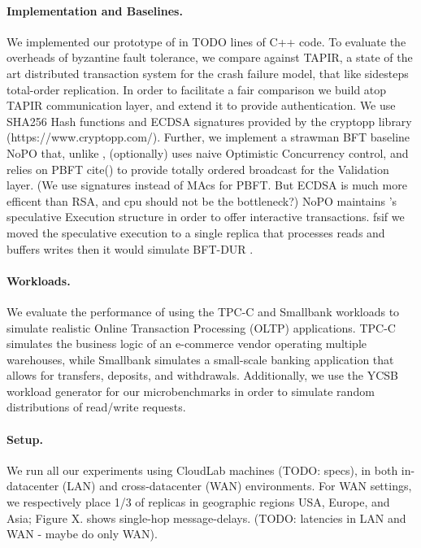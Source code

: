 \paragraph{Implementation and Baselines.} We implemented our prototype of \sys in TODO lines of C++ code. To evaluate the overheads of byzantine fault tolerance, we compare against TAPIR\cite{zhang2015tapir}, a state of the art distributed transaction system for the crash failure model, that like \sys sidesteps total-order replication. In order to facilitate a fair comparison we build \sys atop TAPIR communication layer, and extend it to provide authentication. We use SHA256 Hash functions and ECDSA signatures provided by the cryptopp library (https://www.cryptopp.com/). Further, we implement a strawman BFT baseline NoPO that, unlike \sys, (optionally) uses naive Optimistic Concurrency control, and relies on PBFT cite() to provide totally ordered broadcast for the Validation layer. (We use signatures instead of MAcs for PBFT. But ECDSA is much more efficent than RSA, and cpu should not be the bottleneck?) NoPO maintains \sys 's speculative Execution structure in order to offer interactive transactions. fs{if we moved the speculative execution to a single replica that processes reads and buffers writes then it would simulate BFT-DUR }. 

\paragraph{Workloads.} We evaluate the performance of \sys using the TPC-C and Smallbank workloads to simulate realistic Online Transaction Processing (OLTP) applications. TPC-C simulates the business logic of an e-commerce vendor operating multiple warehouses, while Smallbank simulates a small-scale banking application that allows for transfers, deposits, and withdrawals. Additionally, we use the YCSB workload generator for our microbenchmarks in order to simulate random distributions of read/write requests.

\paragraph{Setup.} We run all our experiments using CloudLab machines (TODO: specs), in both in-datacenter (LAN) and cross-datacenter (WAN) environments. For WAN settings, we respectively place 1/3 of replicas in geographic regions USA, Europe, and Asia; Figure X. shows single-hop message-delays. (TODO: latencies in LAN and WAN - maybe do only WAN).

